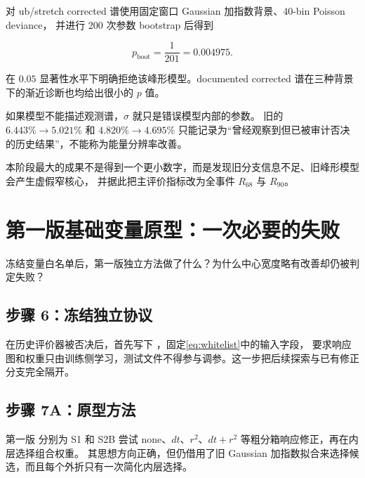 \documentclass[UTF8,12pt,a4paper,oneside,fontset=none]{ctexart}
\numberwithin{equation}{section}
\newcommand{\Rsixtyeight}{R_{68}}
\newcommand{\Rninety}{R_{90}}
\begin{document}
对 ub/stretch corrected 谱使用固定窗口 Gaussian 加指数背景、40-bin Poisson deviance，
并进行 200 次参数 bootstrap 后得到

\begin{equation}
p_{\mathrm{boot}}=\frac{1}{201}=0.004975.
\label{eq:historical-gof}
\end{equation}

在 \(0.05\) 显著性水平下明确拒绝该峰形模型。documented corrected 谱在三种背景下的渐近诊断也均给出很小的 \(p\) 值。

\begin{warningbox}[title={为什么旧的窄峰不能保留为成果}]
如果模型不能描述观测谱，\(\sigma\) 就只是错误模型内部的参数。
旧的 \(6.443\%\rightarrow5.021\%\) 和 \(4.820\%\rightarrow4.695\%\)
只能记录为“曾经观察到但已被审计否决的历史结果”，不能称为能量分辨率改善。
\end{warningbox}

\begin{conclusionbox}
本阶段最大的成果不是得到一个更小数字，而是发现旧分支信息不足、旧峰形模型会产生虚假窄核心，
并据此把主评价指标改为全事件 \(\Rsixtyeight\) 与 \(\Rninety\)。
\end{conclusionbox}

\section{第一版基础变量原型：一次必要的失败}

\begin{questionbox}
冻结变量白名单后，第一版独立方法做了什么？为什么中心宽度略有改善却仍被判定失败？
\end{questionbox}

\subsection{步骤 6：冻结独立协议}

在历史评价器被否决后，首先写下 ，固定\cref{eq:whitelist}中的输入字段，
要求响应图和权重只由训练侧学习，测试文件不得参与调参。这一步把后续探索与已有修正分支完全隔开。

\subsection{步骤 7A：原型方法}

第一版  分别为 S1 和 S2B 尝试
none、\(dt\)、\(r^2\)、\(dt+r^2\) 等粗分箱响应修正，再在内层选择组合权重。
其思想方向正确，但仍借用了旧 Gaussian 加指数拟合来选择候选，而且每个外折只有一次简化内层选择。
\end{document}
